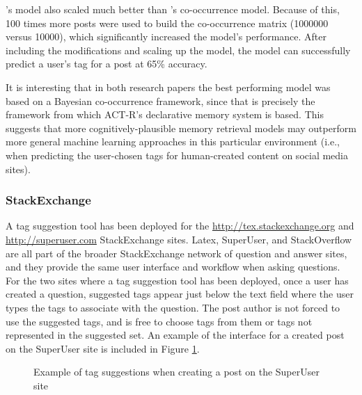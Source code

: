 \documentclass[man,floatsintext,donotrepeattitle]{apa6}
\begin{document}
\citeauthor{Stanley2013}'s model also scaled much better than \citeauthor{Kuo2011}'s co-occurrence model. 
Because of this, 100 times more posts were used to build the co-occurrence matrix (\num{1000000} versus \num{10000}), which significantly increased the model's performance.
After including the modifications and scaling up the model, the model can successfully predict a user's tag for a post at 65\% accuracy.

It is interesting that in both research papers the best performing model was based on a Bayesian co-occurrence framework, since that is precisely the framework from which ACT-R's declarative memory system is based.
This suggests that more cognitively-plausible memory retrieval models may outperform more general machine learning approaches in this particular environment
(i.e., when predicting the user-chosen tags for human-created content on social media sites).

\subsubsection{StackExchange}

A tag suggestion tool has been deployed for the \url{http://tex.stackexchange.org} \parencite{LatexTags2013} and \url{http://superuser.com} \parencite{SuperUserTags2013} StackExchange sites.
Latex, SuperUser, and StackOverflow are all part of the broader StackExchange network of question and answer sites, and they provide the same user interface and workflow when asking questions.
For the two sites where a tag suggestion tool has been deployed, once a user has created a question, suggested tags appear just below the text field where the user types the tags to associate with the question.
The post author is not forced to use the suggested tags, and is free to choose tags from them or tags not represented in the suggested set.
An example of the interface for a created post on the SuperUser site is included in Figure \ref{figSuperUserSuggestion}.

\begin{figure}[!htbp]
  \caption{Example of tag suggestions when creating a post on the SuperUser site}
  \label{figSuperUserSuggestion}
\end{figure}
\end{document}
